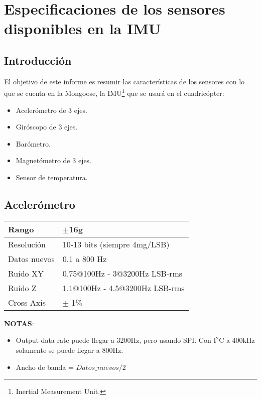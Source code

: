\documentclass[spanish,12pt,a4paper,titlepage]{report}
\begin{document}
\chapter{Especificaciones de los sensores disponibles en la IMU}
\label{chap-specs-sensores}


\section{Introducción}
\label{sec:intro}

El objetivo de este informe es resumir las características de los sensores con lo que se cuenta en la Mongoose, la IMU\footnote{Inertial Measurement Unit.} que se usará en el cuadricópter:
\begin{itemize}
\item Acelerómetro de 3 ejes.
\item Giróscopo de 3 ejes.
\item Barómetro.
\item Magnetómetro de 3 ejes.
\item Sensor de temperatura.
\end{itemize}

\newpage
\section{Acelerómetro}
\label{sec:acc}

\begin{table}[H]
\begin{center}
\begin{tabular}{|p{3cm}|p{6.5cm}|}
\hline
Rango & $\pm$16g \\
\hline
Resolución & 10-13 bits (siempre 4mg/LSB) \\
\hline
Datos nuevos &  0.1 a 800 Hz\\
\hline
Ruído XY & 0.75@100Hz - 3@3200Hz LSB-rms\\
\hline
Ruído Z & 1.1@100Hz - 4.5@3200Hz LSB-rms\\
\hline
Cross Axis & $\pm$ 1\% \\
\hline
\end{tabular}
\label{tab:acc}
\end{center}
\end{table}

\textbf{NOTAS}:
\begin{itemize}
\item Output data rate puede llegar a 3200Hz, pero usando SPI. Con I$^2$C a 400kHz solamente se puede llegar a 800Hz.
\item Ancho de banda = $Datos\_nuevos/2$
\end{itemize}
\end{document}
